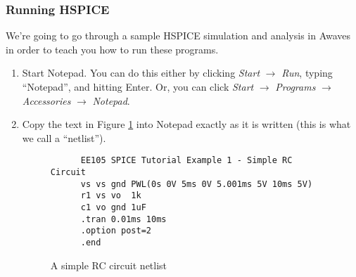 \documentclass{article}
\begin{document}
\subsubsection{Running HSPICE}

We're going to go through a sample HSPICE simulation and analysis in Awaves in order to teach you how to run these programs.

\begin{enumerate}
\item Start Notepad. You can do this either by clicking \textit{Start} $\rightarrow$ \textit{Run}, typing ``Notepad'', and hitting Enter. Or, you can click \textit{Start} $\rightarrow$ \textit{Programs} $\rightarrow$ \textit{Accessories} $\rightarrow$ \textit{Notepad}.
\item Copy the text in Figure \ref{rccircuit} into Notepad exactly as it is written (this is what we call a ``netlist'').
  
  \begin{figure}[!htb]
    \begin{verbatim}
      EE105 SPICE Tutorial Example 1 - Simple RC Circuit
      vs vs gnd PWL(0s 0V 5ms 0V 5.001ms 5V 10ms 5V)
      r1 vs vo  1k
      c1 vo gnd 1uF
      .tran 0.01ms 10ms
      .option post=2
      .end \end{verbatim}
    \caption{A simple RC circuit netlist}
    \label{rccircuit}
  \end{figure}
  

\end{enumerate}
\end{document}
